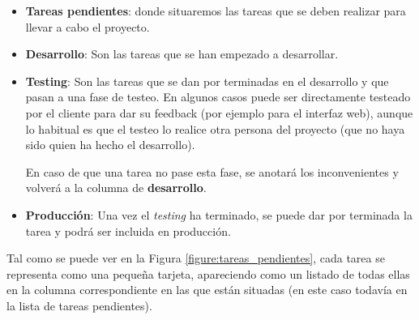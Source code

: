 \documentclass{\ClassPath/viu-tfm-template}
\begin{document}
\begin{minipage}{0.60\linewidth}
    \begin{itemize}
        \item \textbf{Tareas pendientes}: donde situaremos las tareas que se deben realizar para llevar a cabo el proyecto.
        \item \textbf{Desarrollo}: Son las tareas que se han empezado a desarrollar.
        \item \textbf{Testing}: Son las tareas que se dan por terminadas en el desarrollo y que pasan a una fase de testeo. En algunos casos puede ser directamente testeado por el cliente para dar su feedback (por ejemplo para el interfaz web), aunque lo habitual es que el testeo lo realice otra persona del proyecto (que no haya sido quien ha hecho el desarrollo).

        En caso de que una tarea no pase esta fase, se anotará los inconvenientes y volverá a la columna de \textbf{desarrollo}.
        \item \textbf{Producción}: Una vez el \textit{testing} ha terminado, se puede dar por terminada la tarea y podrá ser incluida en producción.
    \end{itemize}

    Tal como se puede ver en la Figura \ref{figure:tareas_pendientes}, cada tarea se representa como una pequeña tarjeta, apareciendo como un listado de todas ellas en la columna correspondiente en las que están situadas (en este caso todavía en la lista de tareas pendientes).
\end{minipage}
\hfill
\end{document}
